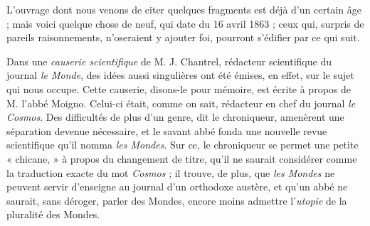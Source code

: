 \documentclass[a4paper, 11pt, oneside, landscape]{article}
\begin{document}
L'ouvrage dont nous venons de citer quelques fragments est déjà d'un certain âge ; mais voici quelque chose de neuf, qui date du 16 avril 1863 ; ceux qui, surpris de pareils raisonnements, n'oseraient y ajouter foi, pourront s'édifier par ce qui suit.

Dans une \emph{causerie scientifique} de M. J. Chantrel, rédacteur scientifique du journal \emph{le Monde}, des idées aussi singulières ont été émises, en effet, sur le sujet qui nous occupe. Cette causerie, disons-le pour mémoire, est écrite à propos de M. l'abbé Moigno. Celui-ci était, comme on sait, rédacteur en chef du journal \emph{le Cosmos}. Des difficultés de plus d'un genre, dit le chroniqueur, amenèrent une séparation devenue nécessaire, et le savant abbé fonda une nouvelle revue scientifique qu'il nomma \emph{les Mondes}. Sur ce, le chroniqueur se permet une petite « chicane, » à propos du changement de titre, qu'il ne saurait considérer comme la traduction exacte du mot \emph{Cosmos} ; il trouve, de plus, que \emph{les Mondes} ne peuvent servir d'enseigne au journal d'un orthodoxe austère, et qu'un abbé ne saurait, sans déroger, parler des Mondes, encore moins admettre l'\emph{utopie} de la pluralité des Mondes.
\end{document}
